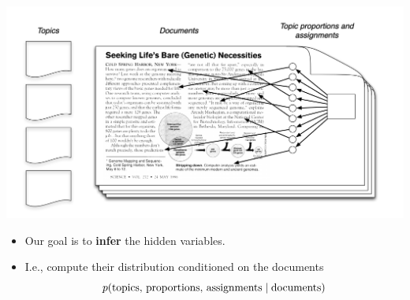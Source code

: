 \documentclass[10pt]{beamer}
\begin{document}
\begin{frame}

\begin{center}
\includegraphics[width=\textwidth]{images/lda_intro_2}
\end{center}


\begin{itemize}
\item Our goal is to \textbf{infer} the hidden variables.
\item I.e., compute their distribution conditioned on the documents
\[ p(\text{topics, proportions, assignments} \; | \; \text{documents} ) \]
\end{itemize}

\end{frame}
\end{document}
